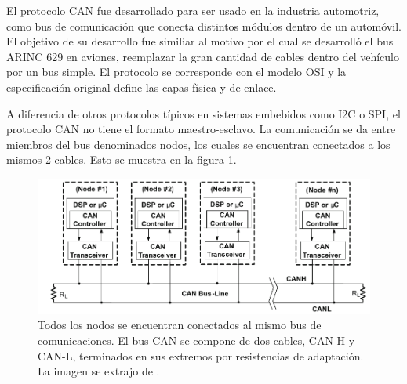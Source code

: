 



El protocolo CAN fue desarrollado para ser usado en la industria automotriz, como bus de comunicación que conecta distintos módulos dentro de un automóvil. El objetivo de su desarrollo fue similiar al motivo por el cual se desarrolló el bus ARINC 629 en aviones, reemplazar la gran cantidad de cables dentro del vehículo por un bus simple. El protocolo se corresponde con el modelo OSI y la especificación original define las capas física y de enlace.

A diferencia de otros protocolos típicos en sistemas embebidos como I2C o SPI, el protocolo CAN no tiene el formato maestro-esclavo. La comunicación se da entre miembros del bus denominados nodos, los cuales se encuentran conectados a los mismos 2 cables. Esto se muestra en la figura \ref{fig:red_CAN_2}. 

\begin{figure}[H]
    \centering
    \includegraphics[width=\textwidth]{img/red_CAN.png}
    \caption{Todos los nodos se encuentran conectados al mismo bus de comunicaciones. El bus CAN se compone de dos cables, CAN-H y CAN-L, terminados en sus extremos por resistencias de adaptación. La imagen se extrajo de \cite{texasSLOA101B}.}
    \label{fig:red_CAN_2}
\end{figure}

